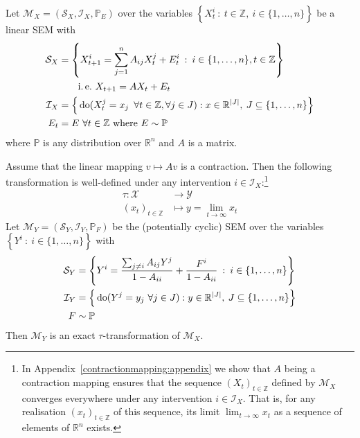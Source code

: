 \begin{theorem}\label{theorem:identical}
Let $\mathcal{M}_X = \left(\mathcal{S}_X, \mathcal{I}_X, \mathbb{P}_{E} \right)$ over the variables ${\left\lbrace X_t^i \: : \: t \in \mathbb{Z}, \: i\in \{1,\ldots,n\} \right\rbrace}$ be a linear SEM with
%
\begin{align*}
\mathcal{S}_X &= \left\lbrace X_{t+1}^i = \sum_{j=1}^n A_{ij}X_t^j + E_t^i \:  : \: i \in \{1,\ldots,n\}, t\in\mathbb{Z} \right\rbrace \\
&\qquad\text{i.\,e.}\ X_{t+1} = AX_t + E_t \\
%
\mathcal{I}_X &= \Big{\{} \doop(X_t^j= x_j \enspace \forall t \in \mathbb{Z},\forall j \in J):  x \in \mathbb{R}^{|J|}, \: J \subseteq \{1,\ldots,n\} \Big{\}} \\
%
E_t &= E\ \forall t\in\mathbb{Z} \text{ where } E \sim \mathbb{P}
\end{align*}
%
where $\mathbb{P}$ is any distribution over $\mathbb{R}^n$ and $A$ is a matrix.

Assume that the linear mapping $v\mapsto Av$ is a contraction.
Then the following transformation is well-defined under any intervention $i\in\mathcal{I}_X$:\footnote{In Appendix~\ref{contractionmapping:appendix} we show that $A$ being a contraction mapping ensures that the sequence $(X_t)_{t\in\mathbb{Z}}$ defined by $\mathcal{M}_X$ converges everywhere under any intervention $i\in\mathcal{I}_X$. That is, for any realisation $(x_t)_{t\in\mathbb{Z}}$ of this sequence, its limit $\lim_{t\rightarrow \infty}x_t$ as a sequence of elements of $\mathbb{R}^n$ exists.}
%
\begin{align*}
\tau : \mathcal{X} &\rightarrow \mathcal{Y} \\
(x_t)_{t\in \mathbb{Z}} & \mapsto y= \lim_{t\rightarrow \infty} x_t
\end{align*}
%
Let ${\mathcal{M}_Y = \left(\mathcal{S}_Y, \mathcal{I}_Y, \mathbb{P}_{F} \right)}$ be the (potentially cyclic) SEM over the variables ${\left\lbrace Y^i \: :  \: i\in \{1,\ldots,n\} \right\rbrace}$  with
%
\begin{align*}
\mathcal{S}_Y &= \left\lbrace Y^i = \frac{\sum_{j\not=i} A_{ij}Y^j}{1-A_{ii}} + \frac{F^i}{1-A_{ii}} \:  : \: i \in \{1,\ldots,n\} \right\rbrace \\
%
\mathcal{I}_Y &= \Big{\{} \doop(Y^j= y_j \ \forall j \in J) : y \in \mathbb{R}^{|J|}, \: J \subseteq \{1,\ldots,n\} \Big{\}} \\
%
F &\sim \mathbb{P}
\end{align*}
%
Then $\mathcal{M}_Y$ is an exact $\tau$-transformation of $\mathcal{M}_X$.
\end{theorem}

